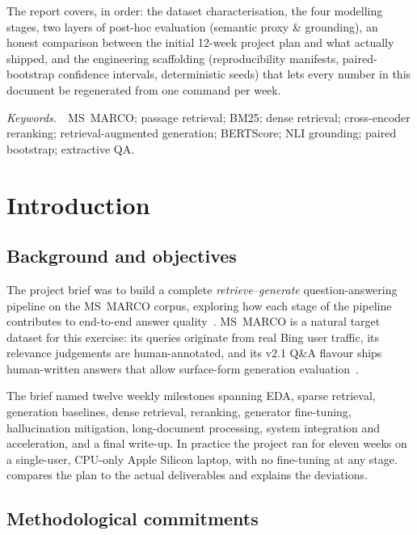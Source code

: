 \documentclass[11pt,a4paper]{article}
\newcommand{\msmarco}{MS~MARCO}
\newcommand{\bertscore}{BERTScore}
\newcommand{\bmtwofive}{BM25}
\begin{document}
The report covers, in order: the dataset characterisation, the four
modelling stages, two layers of post-hoc evaluation (semantic proxy
\& grounding), an honest comparison between the initial 12-week
project plan and what actually shipped, and the engineering
scaffolding (reproducibility manifests, paired-bootstrap confidence
intervals, deterministic seeds) that lets every number in this
document be regenerated from one command per week.

\vspace{2em}
\noindent\textit{Keywords.}~~MS~MARCO; passage retrieval; \bmtwofive{};
dense retrieval; cross-encoder reranking; retrieval-augmented
generation; \bertscore{}; NLI grounding; paired bootstrap;
extractive QA.

\newpage
\tableofcontents
\clearpage
\listoftables
\listoffigures
\clearpage

\clearpage\section{Introduction}
\label{sec:intro}

\subsection{Background and objectives}

The project brief was to build a complete
\emph{retrieve--generate} question-answering pipeline on the
\msmarco{} corpus, exploring how each stage of the pipeline
contributes to end-to-end answer quality~\cite{bajaj2016msmarco,lewis2020rag}.
\msmarco{} is a natural target dataset for this exercise: its
queries originate from real Bing user traffic, its
relevance judgements are human-annotated, and its v2.1 Q\&A flavour
ships human-written answers that allow surface-form generation
evaluation~\cite{nguyen2016msmarcoqa}.

The brief named twelve weekly milestones spanning EDA, sparse
retrieval, generation baselines, dense retrieval, reranking,
generator fine-tuning, hallucination mitigation, long-document
processing, system integration and acceleration, and a final
write-up.  In practice the project ran for eleven weeks on a
single-user, CPU-only Apple Silicon laptop, with no fine-tuning at
any stage.   compares the plan to the actual
deliverables and explains the deviations.

\subsection{Methodological commitments}
\end{document}
